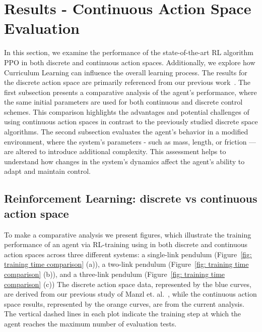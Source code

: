 \section{Results - Continuous Action Space Evaluation} \label{sec: Continuous Action Space Evaluation}
 
In this section, we examine the performance of the state-of-the-art RL algorithm PPO in both discrete and continuous action spaces. Additionally, we explore how Curriculum Learning can influence the overall learning process. The results for the discrete action space are primarily referenced from our previous work~\cite{manzl2023relrl}.
The first subsection presents a comparative analysis of the agent’s performance, where the same initial parameters are used for both continuous and discrete control schemes. This comparison highlights the advantages and potential challenges of using continuous action spaces in contrast to the previously studied discrete space algorithms.
The second subsection evaluates the agent’s behavior in a modified environment, where the system’s parameters - such as mass, length, or friction — are altered to introduce additional complexity. This assessment helps to understand how changes in the system’s dynamics affect the agent’s ability to adapt and maintain control.

\subsection{Reinforcement Learning: discrete vs continuous action space} \label{Reinforcement Learning: discrete vs continuous action space}

To make a comparative analysis we present figures, which illustrate the training performance of an agent via RL-training using in both discrete and continuous action spaces across three different systems: a single-link pendulum (Figure~\ref{fig: training time comparison} (a)), a two-link pendulum (Figure~\ref{fig: training time comparison} (b)), and a three-link pendulum (Figure~\ref{fig: training time comparison} (c)) The discrete action space data, represented by the blue curves, are derived from our previous study of Manzl et. al.~\cite{manzl2023relrl}, while the continuous action space results, represented by the orange curves, are from the current analysis. The vertical dashed lines in each plot indicate the training step at which the agent reaches the maximum number of evaluation tests.

